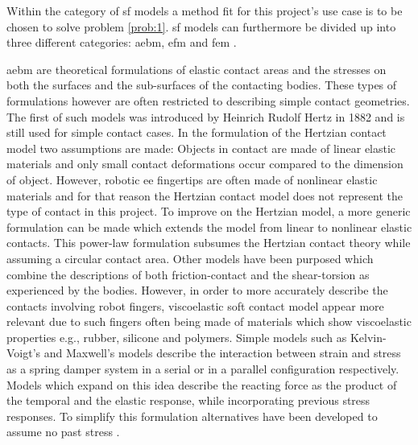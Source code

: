 Within the category of \gls{sf} models a method fit for this project's use case is to be chosen to solve problem \ref{prob:1}. \gls{sf} models can furthermore be divided up into three different categories: \gls{aebm}, \gls{efm} and \gls{fem} \cite{a-modified-elastic-foundation-contact-model-for-application-in-3d-models-of-the-prosthetic-knee}. \medskip

\gls{aebm} are theoretical formulations of elastic contact areas and the stresses on both the surfaces and the sub-surfaces of the contacting bodies. These types of formulations however are often restricted to describing simple contact geometries. The first of such models was introduced by Heinrich Rudolf Hertz in 1882\cite*{on-the-contact-of-rigid-elastic-solids-and-on-hardness} and is still used for simple contact cases. In the formulation of the Hertzian contact model two assumptions are made: Objects in contact are made of linear elastic materials and only small contact deformations occur compared to the dimension of object. However, robotic \gls{ee} fingertips are often made of nonlinear elastic materials and for that reason the Hertzian contact model does not represent the type of contact in this project\cite[Chapter 37]{handbook-of-robotics}. To improve on the Hertzian model, a more generic formulation can be made which extends the model from linear to nonlinear elastic contacts\cite*{modeling-of-contact-mechanics-and-friction-limit-surfaces-for-soft-fingers-in-robotics-with-experimental-results}\cite*{the-haptic-and-perceptional-characteristics-of-an-anthropomorphic-curved-soft-finger-structure}. This power-law formulation subsumes the Hertzian contact theory while assuming a circular contact area. Other models have been purposed which combine the descriptions of both friction-contact and the shear-torsion as experienced by the bodies\cite{the-sliding-of-robot-fingers-under-combined-torsion-and-shear-loading}. However, in order to more accurately describe the contacts involving robot fingers, viscoelastic soft contact model appear more relevant due to such fingers often being made of materials which show viscoelastic properties e.g., rubber, silicone and polymers. Simple models such as  Kelvin-Voigt's\cite*{viscoelasticity} and Maxwell's\cite{on-the-dynamical-theory-of-gases} models describe the interaction between strain and stress as a spring damper system in a serial or in a parallel configuration respectively. Models which expand on this idea describe the reacting force as the product of the temporal and the elastic response, while incorporating previous stress responses\cite{mechanical-properties-and-active-remodeling-of-blood-vessels}.
To simplify this formulation alternatives have been developed to assume no past stress \cite{modeling-of-viscoelastic-contacts-and-evolution-of-limit-surface-for-robotic-contact-interface}\cite*{characteristics-of-contact-and-limit-surface-for-viscoelastic-fingers}\cite*{effect-of-layer-compliance-on-frictional-behavior-of-soft-robotic-fingers}.

